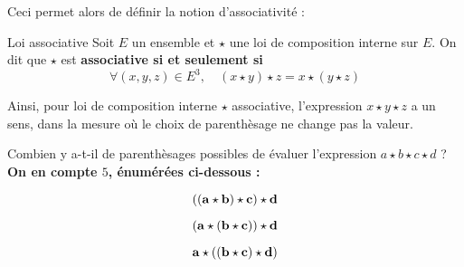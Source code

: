 \documentclass[a4paper,french,bookmarks]{article}
\begin{document}
Ceci permet alors de définir la notion d'associativité :

\begin{definition}{Loi associative}{}
    Soit $E$ un ensemble et $\star$ une loi de composition interne sur $E$. On dit que $\star$ est \bf{associative} si et seulement si
    \[\forall (x, y, z) \in E^3,\quad (x\star y)\star z = x\star(y\star z) \]
\end{definition}

Ainsi, pour loi de composition interne $\star$ associative, l'expression $x \star y \star z$ a un sens, dans la mesure où le choix de parenthèsage ne change pas la valeur.

\begin{example}{}{}
    Combien y a-t-il de parenthèsages possibles de évaluer l'expression $a \star b \star c \star d$ ?
    \tcblower
    \bf{On en compte $5$}, énumérées ci-dessous :\\[-20pt]
\begin{minipage}[t]{.19\linewidth}
\[ \bf{((a \star b) \star c) \star d}\]
\centering{}
\end{minipage}
\begin{minipage}[t]{.19\linewidth}
\[ \bf{(a \star (b \star c)) \star d}\]
\centering{}
\end{minipage}
\begin{minipage}[t]{.19\linewidth}
\[ \bf{a \star ((b \star c) \star d)}\]
\centering{}
\end{minipage}
\end{example}
\end{document}
